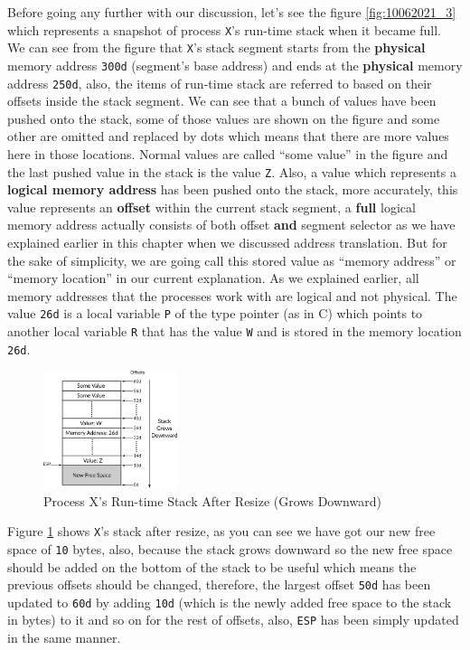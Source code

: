 Before going any further with our discussion, let's see the figure
\ref{fig:10062021_3} which represents a snapshot of process
\lstinline!X!'s run-time stack when it became full. We can see from the
figure that \lstinline!X!'s stack segment starts from the
\textbf{physical} memory address \lstinline!300d! (segment's base
address) and ends at the \textbf{physical} memory address
\lstinline!250d!, also, the items of run-time stack are referred to
based on their offsets inside the stack segment. We can see that a bunch
of values have been pushed onto the stack, some of those values are
shown on the figure and some other are omitted and replaced by dots
which means that there are more values here in those locations. Normal
values are called ``some value'' in the figure and the last pushed value
in the stack is the value \lstinline!Z!. Also, a value which represents
a \textbf{logical memory address} has been pushed onto the stack, more
accurately, this value represents an \textbf{offset} within the current
stack segment, a \textbf{full} logical memory address actually consists
of both offset \textbf{and} segment selector as we have explained
earlier in this chapter when we discussed address translation. But for
the sake of simplicity, we are going call this stored value as ``memory
address'' or ``memory location'' in our current explanation. As we
explained earlier, all memory addresses that the processes work with are
logical and not physical. The value \lstinline!26d! is a local variable
\lstinline!P! of the type pointer (as in C) which points to another
local variable \lstinline!R! that has the value \lstinline!W! and is
stored in the memory location \lstinline!26d!.

\begin{figure}
\centering
\includegraphics[width=0.35000\textwidth]{Figures/x86-ch/Fig10062021_4.png}
\caption{Process X's Run-time Stack After Resize (Grows
Downward)}\label{fig:10062021_4}
\end{figure}

Figure \ref{fig:10062021_4} shows \lstinline!X!'s stack after resize, as
you can see we have got our new free space of \lstinline!10! bytes,
also, because the stack grows downward so the new free space should be
added on the bottom of the stack to be useful which means the previous
offsets should be changed, therefore, the largest offset \lstinline!50d!
has been updated to \lstinline!60d! by adding \lstinline!10d! (which is
the newly added free space to the stack in bytes) to it and so on for
the rest of offsets, also, \lstinline!ESP! has been simply updated in
the same manner.

